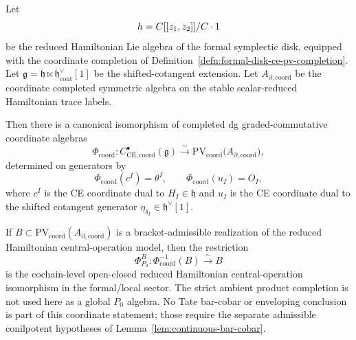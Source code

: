 \documentclass[11pt]{memoir}
\begin{document}
\begin{thm}
\label{thm:reduced-ce-pv-central-operation}
\label{thm:formal-disk-completed-ce-pv}
\label{thm:finite-cotangent-ce-pv-identity}
\label{thm:universal-formal-local-ce-pv-recognition}
\label{prop:cotangent-coordinate-boundary-hamiltonian}
  Let
  \[
    h=C[[z_1,z_2]]/C\cdot1
  \]
  be the reduced Hamiltonian Lie algebra of the formal symplectic disk,
  equipped with the coordinate completion of
  Definition~\ref{defn:formal-disk-ce-pv-completion}.
  Let $\mathfrak g=\mathfrak h\ltimes\mathfrak h^\vee_{\mathrm{cont}}[1]$
  be the shifted-cotangent extension. Let
  \(A_{\partial,\mathrm{coord}}\) be the coordinate completed symmetric
  algebra on the stable scalar-reduced Hamiltonian trace labels.

		  Then there is a canonical isomorphism of completed dg
		  graded-commutative coordinate algebras
		  $$\Phi_{\mathrm{coord}}:C^\bullet_{\mathrm{CE},\mathrm{coord}}(\mathfrak g)
		    \xrightarrow{\ \sim\ }
		    \mathrm{PV}_{\mathrm{coord}}\bigl(A_{\partial,\mathrm{coord}}\bigr),$$
		  determined on generators by
		  $$\Phi_{\mathrm{coord}}(c^I)=\theta^I,\qquad
		    \Phi_{\mathrm{coord}}(u_I)=O_I,$$
  where $c^I$ is the CE coordinate dual to $H_I\in\mathfrak h$ and
  $u_I$ is the CE coordinate dual to the shifted cotangent generator
  $\eta_{\delta_I}\in\mathfrak h^\vee[1]$.

	  If \(B\subset\mathrm{PV}_{\mathrm{coord}}(A_{\partial,\mathrm{coord}})\) is a
	  bracket-admissible realization of the reduced Hamiltonian
	  central-operation model, then the restriction
	  \[
	    \Phi^B_{P_0}\colon\Phi_{\mathrm{coord}}^{-1}(B)
	    \xrightarrow{\sim}B
	  \]
		  is the cochain-level open-closed reduced Hamiltonian
		  central-operation isomorphism in the formal/local sector.  The strict
		  ambient product completion is not used here as a global \(P_0\)
		  algebra.  No Tate bar-cobar or enveloping conclusion is part of this
		  coordinate statement; those require the separate admissible
		  conilpotent hypotheses of Lemma~\ref{lem:continuous-bar-cobar}.
\end{thm}
\end{document}
